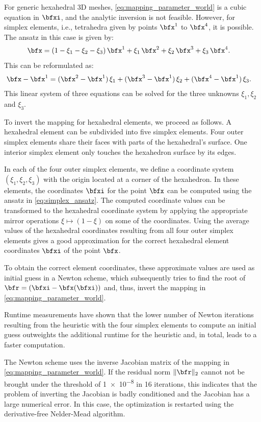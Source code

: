 For generic hexahedral 3D meshes, \cref{eq:mapping_parameter_world} is a cubic equation in $\bfxi$, and the analytic inversion is not feasible. However, for simplex elements, i.e., tetrahedra given by points $\bfx^1$ to $\bfx^4$, it is possible. The ansatz in this case is given by:
\begin{align*}
  \bfx &= (1-\xi_1-\xi_2-\xi_3)\,\bfx^1 + \xi_1\,\bfx^2 + \xi_2\,\bfx^3 + \xi_3\,\bfx^4.
\end{align*}
This can be reformulated as:
\begin{align}\label{eq:simplex_ansatz}
   \bfx-\bfx^1 &= (\bfx^2 - \bfx^1)\,\xi_1 + (\bfx^3  - \bfx^1)\,\xi_2 + (\bfx^4 - \bfx^1)\,\xi_3.
\end{align}
This linear system of three equations can be solved for the three unknowns $\xi_1,\xi_2$ and $\xi_3$.

To invert the mapping for hexahedral elements, we proceed as follows.
A hexahedral element can be subdivided into five simplex elements. 
Four outer simplex elements share their faces with parts of the hexahedral's surface. One interior simplex element only touches the hexahedron surface by its edges. 

In each of the four outer simplex elements, we define a coordinate system $(\xi_1,\xi_2,\xi_3)$ with the origin located at a corner of the hexahedron. 
In these elements, the coordinates $\bfxi$ for the point $\bfx$ can be computed  using the ansatz in \cref{eq:simplex_ansatz}. The computed coordinate values can be transformed to the hexahedral coordinate system by applying the appropriate mirror operations $\xi \mapsto (1-\xi)$ on some of the coordinates. Using the average values of the hexahedral coordinates resulting from all four outer simplex elements gives a good approximation for the correct hexahedral element coordinates $\bfxi$ of the point $\bfx$.

To obtain the correct element coordinates, these approximate values are used as initial guess in a Newton scheme, which subsequently tries to find the root of $\bfr = (\bfxi - \bfx(\bfxi))$ and, thus, invert the mapping in \cref{eq:mapping_parameter_world}. 

Runtime measurements have shown that the lower number of Newton iterations resulting from the heuristic with the four simplex elements to compute an initial guess outweights the additional runtime for the heuristic and, in total, leads to a faster computation.

The Newton scheme uses the inverse Jacobian matrix of the mapping in \cref{eq:mapping_parameter_world}. If the residual norm $\Vert\bfr\Vert_2$ cannot not be brought under the threshold of \num{1e-8} in 16 iterations, this indicates that the problem of inverting the Jacobian is badly conditioned and the Jacobian has a large numerical error. In this case, the optimization is restarted using the derivative-free Nelder-Mead algorithm.

